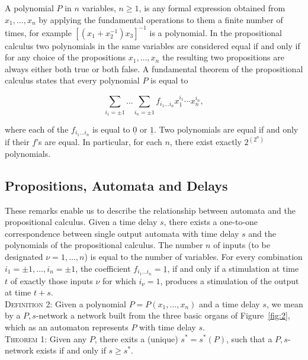 \documentclass[twocolumn,preprintnumbers,amsmath,amssymb,floatfix]{revtex4}
\begin{document}
A polynomial $P$ in $n$ variables, $n \geq 1$, is any formal
expression obtained from $x_1, \ldots, x_n$ by applying the
fundamental operations to them a finite number of times, for
example $[(x_1 + x_2^{-1})x_3]^{-1}$ is a polynomial. In the
propositional calculus two polynomials in the same variables are
considered equal if and only if for any choice of the propositions
$x_1, \ldots, x_n$ the resulting two propositions are always
either both true or both false. A fundamental theorem of the
propositional calculus states that every polynomial $P$ is equal
to

\begin{equation*}
\sum_{i_1=\pm1} \ldots \sum_{i_n=\pm 1}f_{i_1 \ldots i_n}x_1^{i_1}
\cdots x_n^{i_n},
\end{equation*}

\noindent where each of the $f_{i_1 \ldots i_n}$ is equal to
$\underline{0}$ or $\underline{1}$. Two polynomials are equal if
and only if their $f$'s are equal. In particular, for each $n$,
there exist exactly $2^{(2^n)}$ polynomials.

\subsection{\label{sec:three2}Propositions, Automata and Delays}

These remarks enable us to describe the relationship between
automata and the propositional calculus. Given a time delay $s$,
there exists a one-to-one correspondence between single output
automata with time delay $s$ and the polynomials of the
propositional calculus. The number $n$ of inputs (to be designated
$\nu = 1, \ldots, n$) is equal to the number of variables. For
every combination $i_1=\pm1, \dots, i_n=\pm1$, the coefficient
$f_{i_1\dots i_n}=\underline{1}$, if and only if a stimulation at
time $t$ of exactly those inputs $\nu$ for which $i_\nu = 1$,
produces a stimulation of the output at time $t+s$.\\

\noindent \textsc{Definition 2:} Given a polynomial $P=P(x_1,
\dots, x_n)$ and a time delay $s$, we mean by a $P,s$-network a
network built from the three basic organs of Figure~\ref{fig:2},
which as an
automaton represents $P$ with time delay $s$.\\

\noindent \textsc{Theorem 1:} Given any $P$, there exits a
(unique) $s^*=s^*(P)$, such that a $P,s$-network exists if and
only if $s\geq s^*$.\\
\end{document}
